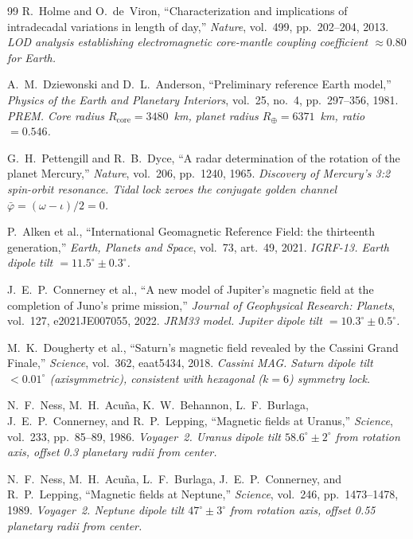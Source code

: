 \begin{thebibliography}{99}
R.~Holme and O.~de~Viron,
``Characterization and implications of intradecadal variations in length of day,''
\emph{Nature}, vol.~499, pp.~202--204, 2013.
\textit{LOD analysis establishing electromagnetic core-mantle coupling coefficient
$\approx 0.80$ for Earth.}

A.~M.~Dziewonski and D.~L.~Anderson,
``Preliminary reference Earth model,''
\emph{Physics of the Earth and Planetary Interiors}, vol.~25, no.~4, pp.~297--356, 1981.
\textit{PREM. Core radius $R_{\text{core}} = 3480$~km, planet radius $R_\oplus = 6371$~km,
ratio $= 0.546$.}

G.~H.~Pettengill and R.~B.~Dyce,
``A radar determination of the rotation of the planet Mercury,''
\emph{Nature}, vol.~206, pp.~1240, 1965.
\textit{Discovery of Mercury's 3:2 spin-orbit resonance. Tidal lock zeroes the
conjugate golden channel $\bar{\varphi} = (\omega - \iota)/2 = 0$.}

P.~Alken et al.,
``International Geomagnetic Reference Field: the thirteenth generation,''
\emph{Earth, Planets and Space}, vol.~73, art.~49, 2021.
\textit{IGRF-13. Earth dipole tilt $= 11.5^\circ \pm 0.3^\circ$.}

J.~E.~P.~Connerney et al.,
``A new model of Jupiter's magnetic field at the completion of Juno's prime mission,''
\emph{Journal of Geophysical Research: Planets}, vol.~127, e2021JE007055, 2022.
\textit{JRM33 model. Jupiter dipole tilt $= 10.3^\circ \pm 0.5^\circ$.}

M.~K.~Dougherty et al.,
``Saturn's magnetic field revealed by the Cassini Grand Finale,''
\emph{Science}, vol.~362, eaat5434, 2018.
\textit{Cassini MAG. Saturn dipole tilt $< 0.01^\circ$ (axisymmetric),
consistent with hexagonal ($k = 6$) symmetry lock.}

N.~F.~Ness, M.~H.~Acu\~na, K.~W.~Behannon, L.~F.~Burlaga,
J.~E.~P.~Connerney, and R.~P.~Lepping,
``Magnetic fields at Uranus,''
\emph{Science}, vol.~233, pp.~85--89, 1986.
\textit{Voyager~2. Uranus dipole tilt $58.6^\circ \pm 2^\circ$ from rotation axis,
offset 0.3 planetary radii from center.}

N.~F.~Ness, M.~H.~Acu\~na, L.~F.~Burlaga, J.~E.~P.~Connerney,
and R.~P.~Lepping,
``Magnetic fields at Neptune,''
\emph{Science}, vol.~246, pp.~1473--1478, 1989.
\textit{Voyager~2. Neptune dipole tilt $47^\circ \pm 3^\circ$ from rotation axis,
offset 0.55 planetary radii from center.}


\end{thebibliography}
